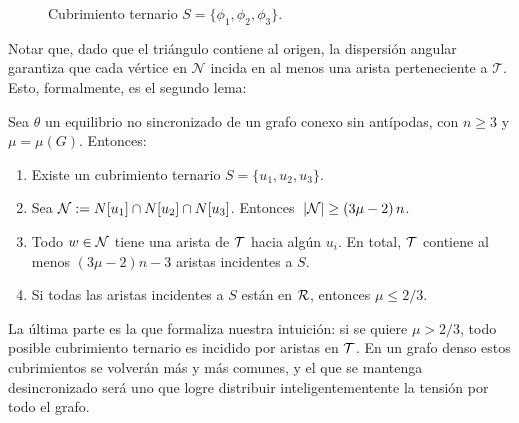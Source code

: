 \begin{figure}[htbp]
    \centering

    \begin{center}
\end{center}

    \caption{Cubrimiento ternario $S=\{\phi_1, \phi_2, \phi_3\}$.}
    \label{fig:c4}
\end{figure}


Notar que, dado que el triángulo contiene al origen, la dispersión angular garantiza que cada vértice en $\mathcal{N}$ incida en al menos una arista perteneciente a $\mathcal{T}$. Esto, formalmente, es el segundo lema:

\begin{lema}[] \label{lema:B}
Sea $\theta$ un equilibrio no sincronizado de un grafo conexo sin antípodas, con $n\ge3$ y $\mu=\mu(G)$. Entonces:
\begin{enumerate}[label=(\arabic*)]
\item Existe un cubrimiento ternario $S=\{u_1,u_2,u_3\}$.
\item Sea $\mathcal{N}:=N[u_1]\cap N[u_2]\cap N[u_3]$. Entonces
$\;|\mathcal{N}|\ge(3\mu-2)\,n$.
\item Todo $w\in\mathcal{N}$ tiene una arista de $\mathcal{T}$ hacia algún $u_i$. En total, $\mathcal{T}$ contiene al menos
$(3\mu-2)n-3$ aristas incidentes a $S$.
\item Si todas las aristas incidentes a $S$ están en $\mathcal{R}$, entonces $\mu\le2/3$.
\end{enumerate}
\end{lema}


La última parte es la que formaliza nuestra intuición: si se quiere $\mu > 2/3$, todo posible cubrimiento ternario es incidido por aristas en $\mathcal{T}$. En un grafo denso estos cubrimientos se volverán más y más comunes, y el que se mantenga desincronizado será uno que logre distribuir inteligentementente la tensión por todo el grafo. 

